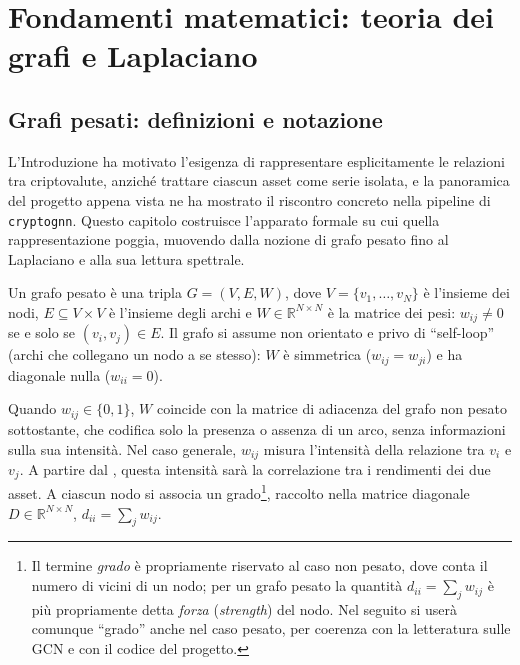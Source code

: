 \chapter{Fondamenti matematici: teoria dei grafi e Laplaciano}
\label{ch:graph-laplacian-theory}

\section{Grafi pesati: definizioni e notazione}
\label{sec:weighted-graphs-notation}

L'Introduzione ha motivato l'esigenza di rappresentare esplicitamente le relazioni tra criptovalute, anziché trattare ciascun asset come serie isolata, e la panoramica del progetto appena vista ne ha mostrato il riscontro concreto nella pipeline di \texttt{cryptognn}. Questo capitolo costruisce l'apparato formale su cui quella rappresentazione poggia, muovendo dalla nozione di grafo pesato fino al Laplaciano e alla sua lettura spettrale.
\begin{definition}
\label{def:weighted-graph}
Un grafo pesato è una tripla $G = (V, E, W)$, dove $V = \{v_1, \dots, v_N\}$ è l'insieme dei nodi, $E \subseteq V \times V$ è l'insieme degli archi e $W \in \mathbb{R}^{N \times N}$ è la matrice dei pesi: $w_{ij} \neq 0$ se e solo se $(v_i, v_j) \in E$. Il grafo si assume non orientato e privo di \enquote{self-loop} (archi che collegano un nodo a se stesso): $W$ è simmetrica ($w_{ij} = w_{ji}$) e ha diagonale nulla ($w_{ii} = 0$).
\end{definition}

Quando $w_{ij} \in \{0,1\}$, $W$ coincide con la matrice di adiacenza del grafo non pesato sottostante, che codifica solo la presenza o assenza di un arco, senza informazioni sulla sua intensità. Nel caso generale, $w_{ij}$ misura l'intensità della relazione tra $v_i$ e $v_j$. A partire dal , questa intensità sarà la correlazione tra i rendimenti dei due asset. A ciascun nodo si associa un grado\footnote{Il termine \emph{grado} è propriamente riservato al caso non pesato, dove conta il numero di vicini di un nodo; per un grafo pesato la quantità $d_{ii} = \sum_j w_{ij}$ è più propriamente detta \emph{forza} (\emph{strength}) del nodo. Nel seguito si userà comunque \enquote{grado} anche nel caso pesato, per coerenza con la letteratura sulle GCN e con il codice del progetto.}, raccolto nella matrice diagonale $D \in \mathbb{R}^{N\times N}$, $d_{ii} = \sum_{j} w_{ij}$.


